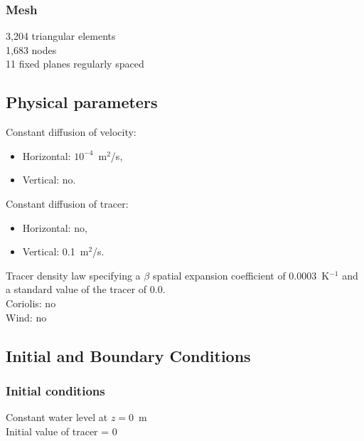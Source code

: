 \subsubsection{Mesh}
%
3,204 triangular elements\\
1,683 nodes\\
11 fixed planes regularly spaced
%
%
%
\subsection{Physical parameters}
%
Constant diffusion of velocity:
\begin{itemize}
\item Horizontal: $10^{-4}$~m$^2$/s,
\item Vertical: no.
\end{itemize}
Constant diffusion of tracer: 
\begin{itemize}
\item Horizontal: no,
\item Vertical: 0.1~m$^2$/s.
\end{itemize}
Tracer density law specifying a $\beta$ spatial expansion coefficient of
0.0003~K$^{-1}$ and a standard value of the tracer of 0.0.\\
Coriolis: no\\
Wind: no
%
%
%
%
%
%
\subsection{Initial and Boundary Conditions}
%
\subsubsection{Initial conditions}
%
Constant water level at $z = 0$~m\\
Initial value of tracer = 0\\
%
